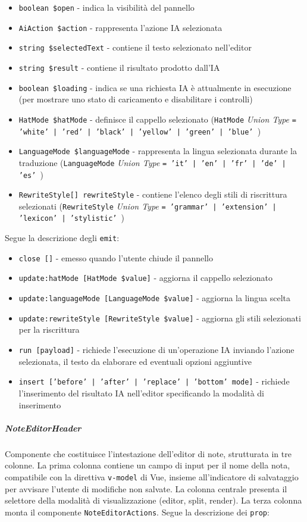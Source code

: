 \documentclass[a4paper,10pt]{article}
\begin{document}
\begin{itemize}
    \item \texttt{boolean \$open} - indica la visibilità del pannello
    \item \texttt{AiAction \$action} - rappresenta l'azione IA selezionata
    \item \texttt{string \$selectedText} - contiene il testo selezionato nell'editor
    \item \texttt{string \$result} - contiene il risultato prodotto dall'IA
    \item \texttt{boolean \$loading} - indica se una richiesta IA è attualmente in esecuzione (per mostrare uno stato di caricamento e disabilitare i controlli)
    \item \texttt{HatMode \$hatMode} - definisce il cappello selezionato (\texttt{HatMode} \textit{Union Type} \texttt{= 'white' | 'red' | 'black' | 'yellow' | 'green' | 'blue' })
    \item \texttt{LanguageMode \$languageMode} - rappresenta la lingua selezionata durante la traduzione (\texttt{LanguageMode} \textit{Union Type} \texttt{= 'it' | 'en' | 'fr' | 'de' | 'es' })
    \item \texttt{RewriteStyle[] rewriteStyle} - contiene l'elenco degli stili di riscrittura selezionati (\texttt{RewriteStyle} \textit{Union Type} \texttt{= 'grammar' | 'extension' | 'lexicon' | 'stylistic' })
\end{itemize}
Segue la descrizione degli \texttt{emit}:
\begin{itemize}
    \item \texttt{close []} - emesso quando l'utente chiude il pannello
    \item \texttt{update:hatMode [HatMode \$value]} - aggiorna il cappello selezionato
    \item \texttt{update:languageMode [LanguageMode \$value]} - aggiorna la lingua scelta
    \item \texttt{update:rewriteStyle [RewriteStyle \$value]} - aggiorna gli stili selezionati per la riscrittura
    \item \texttt{run [payload]} - richiede l'esecuzione di un'operazione IA inviando l'azione selezionata, il testo da elaborare ed eventuali opzioni aggiuntive
    \item \texttt{insert ['before' | 'after' | 'replace' | 'bottom' mode]} - richiede l'inserimento del risultato IA nell'editor specificando la modalità di inserimento
\end{itemize}
\subparagraph{NoteEditorHeader} Componente che costituisce l'intestazione dell'editor di note, strutturata in tre colonne. La prima colonna contiene un campo di input per il nome della nota, compatibile con la direttiva \texttt{v-model} di Vue, insieme all'indicatore di salvataggio per avvisare l'utente di modifiche non salvate. La colonna centrale presenta il selettore della modalità di visualizzazione (editor, split, render). La terza colonna monta il componente \texttt{NoteEditorActions}. Segue la descrizione dei \texttt{prop}:
\end{document}
